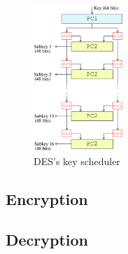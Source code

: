 \begin{figure}[ht]
\begin{center}
\includegraphics[width=0.3\textwidth]{./DESkey}
\end{center}
\caption{DES's key scheduler}
\end{figure}

\subsection{Encryption}
\subsection{Decryption}
